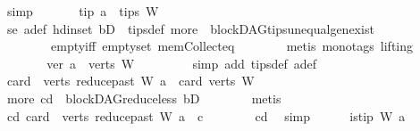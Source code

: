 \begin{isabellebody}
\ simp\ \isanewline
\ \ \ \ \isamarkupfalse%
\ tip{\isacharcolon}{\kern0pt}\ {\isachardoublequoteopen}a\ {\isasymin}\ tips\ W{\isachardoublequoteclose}\ \ \isanewline
\ \ \ \ \ \ \isamarkupfalse%
\ se\ a{\isacharunderscore}{\kern0pt}def\ hd{\isacharunderscore}{\kern0pt}in{\isacharunderscore}{\kern0pt}set\ bD\ \ tips{\isacharunderscore}{\kern0pt}def\ more\ \ blockDAG{\isachardot}{\kern0pt}tips{\isacharunderscore}{\kern0pt}unequal{\isacharunderscore}{\kern0pt}gen{\isacharunderscore}{\kern0pt}exist\ \isanewline
\ \ \ \ \ \ \ \ empty{\isacharunderscore}{\kern0pt}iff\ empty{\isacharunderscore}{\kern0pt}set\ mem{\isacharunderscore}{\kern0pt}Collect{\isacharunderscore}{\kern0pt}eq\isanewline
\ \ \ \ \ \ \isamarkupfalse%
\ {\isacharparenleft}{\kern0pt}metis\ {\isacharparenleft}{\kern0pt}mono{\isacharunderscore}{\kern0pt}tags{\isacharcomma}{\kern0pt}\ lifting{\isacharparenright}{\kern0pt}{\isacharparenright}{\kern0pt}\ \ \ \ \isanewline
\ \ \ \ \isamarkupfalse%
\ \isamarkupfalse%
\ ver{\isacharcolon}{\kern0pt}\ {\isachardoublequoteopen}a\ {\isasymin}\ verts\ W{\isachardoublequoteclose}\ \isanewline
\ \ \ \ \ \ \isamarkupfalse%
\ {\isacharparenleft}{\kern0pt}simp\ add{\isacharcolon}{\kern0pt}\ tips{\isacharunderscore}{\kern0pt}def\ a{\isacharunderscore}{\kern0pt}def{\isacharparenright}{\kern0pt}\ \isanewline
\ \ \ \ \isamarkupfalse%
\ \isamarkupfalse%
\ {\isachardoublequoteopen}card\ {\isacharparenleft}{\kern0pt}\ verts\ {\isacharparenleft}{\kern0pt}reduce{\isacharunderscore}{\kern0pt}past\ W\ a{\isacharparenright}{\kern0pt}{\isacharparenright}{\kern0pt}\ {\isacharless}{\kern0pt}\ card\ {\isacharparenleft}{\kern0pt}verts\ W{\isacharparenright}{\kern0pt}{\isachardoublequoteclose}\isanewline
\ \ \ \ \ \ \isamarkupfalse%
\ more\ cd\ \ blockDAG{\isachardot}{\kern0pt}reduce{\isacharunderscore}{\kern0pt}less\ bD\isanewline
\ \ \ \ \ \ \isamarkupfalse%
\ metis\ \isanewline
\ \ \ \ \isamarkupfalse%
\ \isamarkupfalse%
\ cd{}{\isacharcolon}{\kern0pt}\ {\isachardoublequoteopen}card\ {\isacharparenleft}{\kern0pt}\ verts\ {\isacharparenleft}{\kern0pt}reduce{\isacharunderscore}{\kern0pt}past\ W\ a{\isacharparenright}{\kern0pt}{\isacharparenright}{\kern0pt}\ {\isacharless}{\kern0pt}\ c{\isachardoublequoteclose}\isanewline
\ \ \ \ \ \ \isamarkupfalse%
\ cd\ \isamarkupfalse%
\ simp\isanewline
\ \ \ \ \isamarkupfalse%
\ {\isachardoublequoteopen}is{\isacharunderscore}{\kern0pt}tip\ W\ a{\isachardoublequoteclose}\ \isamarkupfalse%

\end{isabellebody}
